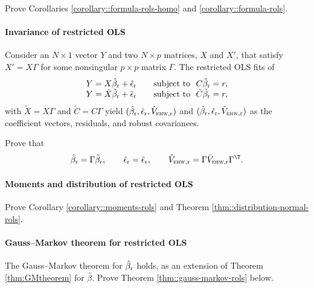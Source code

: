Prove Corollaries \ref{corollary::formula-rols-homo} and \ref{corollary::formula-rols}. 




\paragraph{Invariance of restricted OLS}\label{para::invariance-rls}

Consider an $N \times 1$ vector $ Y$  and two $N\times p$ matrices, $X$ and $X'$, that satisfy $X' = X\Gamma$ for some nonsingular $p\times p$ matrix $\Gamma$. 
The restricted OLS fits of 
$$
\begin{array}{ll}
Y =  X\hat{\beta}_\textup{r} + \hat{\epsilon}_\textup{r}  &\quad\text{subject to} \ \ C \hat{\beta}_\textup{r}  = r, 
 \\
Y =  \tilde X \tilde{\beta}_\textup{r}  +\tilde{\epsilon}_\textup{r}  &\quad \text{subject to} \ \ \tilde C  \tilde{\beta}_\textup{r}    = r ,
\end{array}
$$
with $\tilde X = X\Gamma$ and $\tilde C = C\Gamma$
yield $(\hat{\beta}_\textup{r} ,  \hat{\epsilon}_\textup{r},  \hat{V}_{\textsc{ehw}, \textup{r}})$ and $(\tilde{\beta}_\textup{r}  ,  \tilde{\epsilon}_\textup{r}  ,  \tilde{V}_{\textsc{ehw}, \textup{r}}  )$ as the coefficient vectors, residuals, and robust covariances. 


Prove that  
$$
\hat{\beta}_\textup{r} = \Gamma \tilde{\beta}_\textup{r} ,\qquad
\hat{\epsilon}_\textup{r} = \tilde{\epsilon}_\textup{r}  ,\qquad
\hat{V}_{\textsc{ehw}, \textup{r}}= \Gamma \tilde{V}_{\textsc{ehw}, \textup{r}}   \Gamma^{\T}.
$$ 


\paragraph{Moments and distribution of restricted OLS}
\label{para::moments-distribution-rols}

Prove Corollary \ref{corollary::moments-rols} and Theorem \ref{thm::distribution-normal-rols}. 


\paragraph{Gauss--Markov theorem for restricted OLS}
\label{para::gauss-markov-rols}

The Gauss--Markov theorem for $\hat{\beta}_\textup{r} $ holds, as an extension of Theorem \ref{thm:GMtheorem} for  $\hat{\beta} $.  Prove Theorem \ref{thm::gauss-markov-rols} below. 

